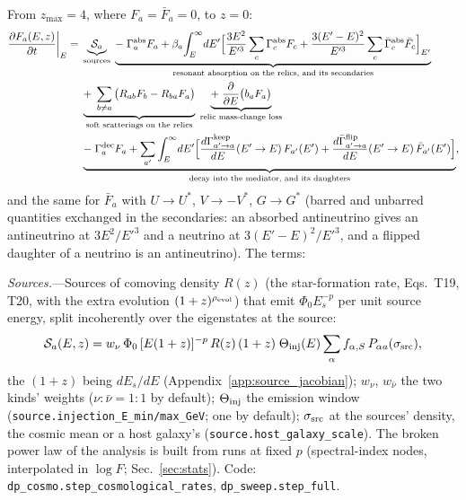 \documentclass[11pt,a4paper]{article}
\begin{document}
From $z_{\max} = 4$, where $F_a = \bar F_a = 0$, to $z = 0$:
\begin{align}
\frac{\partial F_a(E,z)}{\partial t}\bigg|_E ={}&
\underbrace{\mathcal{S}_a}_{\rm sources}
\;\underbrace{-\;\Gamma^{\rm abs}_a F_a
+ \beta_a\!\int_E^\infty\! dE'\Big[\frac{3E^2}{E'^3}\sum_c\Gamma^{\rm abs}_c F_c
+ \frac{3(E'-E)^2}{E'^3}\sum_c\bar\Gamma^{\rm abs}_c\bar F_c\Big]_{E'}}_{\text{resonant absorption on the relics, and its secondaries}}
\nonumber\\
&\underbrace{+\;\sum_{b\ne a}\big(R_{ab}F_b - R_{ba}F_a\big)}_{\text{soft scatterings on the relics}}
\;\underbrace{+\;\frac{\partial}{\partial E}\big(b_a F_a\big)}_{\text{relic mass-change loss}}
\nonumber\\
&\underbrace{-\;\Gamma^{\rm dec}_a F_a
+ \sum_{a'}\int_E^\infty\! dE'\Big[\frac{d\Gamma^{\rm keep}_{a'\to a}}{dE}(E'\to E)\,F_{a'}(E')
+ \frac{d\bar\Gamma^{\rm flip}_{a'\to a}}{dE}(E'\to E)\,\bar F_{a'}(E')\Big]}_{\text{decay into the mediator, and its daughters}},
\label{eq:transport_cosmo}
\end{align}
and the same for $\bar F_a$ with $U \to U^*$, $V \to -V^*$, $G \to G^*$ (barred and unbarred quantities exchanged in the
secondaries: an absorbed antineutrino gives an antineutrino at $3E^2/E'^3$ and a neutrino at $3(E'-E)^2/E'^3$, and a
flipped daughter of a neutrino is an antineutrino). The terms:

\textit{Sources.}---Sources of comoving density $R(z)$ (the star-formation rate, Eqs.~T19, T20, with the extra evolution
$(1+z)^{\rho_{\rm evol}}$) that emit $\Phi_0 E_s^{-p}$ per unit source energy, split incoherently over the eigenstates
at the source:
\begin{equation}
\mathcal{S}_a(E, z) = w_\nu\,\Phi_0\,[E(1+z)]^{-p}\,R(z)\,(1+z)\;\Theta_{\rm inj}(E)\sum_\alpha f_{\alpha,S}\,
P_{\alpha a}(\sigma_{\rm src}),
\label{eq:sources}
\end{equation}
the $(1+z)$ being $dE_s/dE$ (Appendix~\ref{app:source_jacobian}); $w_\nu$, $w_{\bar\nu}$ the two kinds' weights
($\nu:\bar\nu = 1:1$ by default); $\Theta_{\rm inj}$ the emission window (\texttt{source.injection\_E\_min/max\_GeV}; one
by default); $\sigma_{\rm src}$ at the sources' density, the cosmic mean or a host galaxy's
(\texttt{source.host\_galaxy\_scale}). The broken power law of the analysis is built from runs at fixed $p$ (spectral-index
nodes, interpolated in $\log F$; Sec.~\ref{sec:stats}). Code: \texttt{dp\_cosmo.step\_cosmological\_rates},
\texttt{dp\_sweep.step\_full}.
\end{document}
